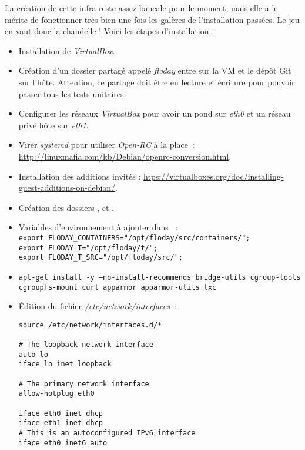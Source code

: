 La création de cette infra reste assez bancale pour le moment, mais elle a le mérite de fonctionner très bien une fois les galères de l'installation passées.
Le jeu en vaut donc la chandelle !
Voici les étapes d'installation~:
\begin{itemize}
	\item Installation de \emph{VirtualBox}.
	\item Création d'un dossier partagé appelé \emph{floday} entre  sur la VM et le dépôt Git sur l'hôte. Attention, ce partage doit être en lecture et écriture pour pouvoir passer tous les tests unitaires.
	\item Configurer les réseaux \emph{VirtualBox} pour avoir un pond sur \emph{eth0} et un réseau privé hôte sur \emph{eth1}.
	\item Virer \emph{systemd} pour utiliser \emph{Open-RC} à la place~: \url{http://linuxmafia.com/kb/Debian/openrc-conversion.html}.
	\item Installation des additions invités : \url{htps://virtualboxes.org/doc/installing-guest-additions-on-debian/}.
	\item Création des dossiers ,  et .
	\item Variables d'environnement à ajouter dans ~:\\
{\tt export FLODAY\_CONTAINERS="/opt/floday/src/containers/";\\
export FLODAY\_T="/opt/floday/t/";\\
export FLODAY\_T\_SRC="/opt/floday/src/";}
	\item {\tt{}apt-get install -y --no-install-recommends bridge-utils cgroup-tools\\
		cgroupfs-mount curl apparmor apparmor-utils lxc}
	\item Édition du fichier \emph{/etc/network/interfaces}~:\\
		\begin{lstlisting}
source /etc/network/interfaces.d/*

# The loopback network interface
auto lo
iface lo inet loopback

# The primary network interface
allow-hotplug eth0

iface eth0 inet dhcp
iface eth1 inet dhcp
# This is an autoconfigured IPv6 interface
iface eth0 inet6 auto


\end{lstlisting}
\end{itemize}
